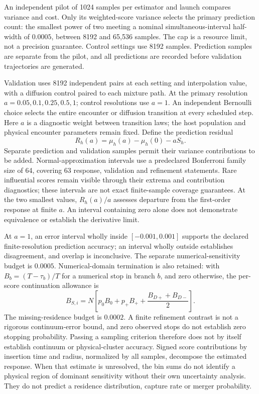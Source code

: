 \documentclass[aps,prd,reprint,amsmath,amssymb,superscriptaddress,nofootinbib,longbibliography,floatfix]{revtex4-2}
\begin{document}
An independent pilot of 1024 samples per estimator and launch compares variance and cost. Only its weighted-score variance selects the primary prediction count: the smallest power of two meeting a nominal simultaneous-interval half-width of $0.0005$, between 8192 and 65,536 samples. The cap is a resource limit, not a precision guarantee. Control settings use 8192 samples. Prediction samples are separate from the pilot, and all predictions are recorded before validation trajectories are generated.

Validation uses 8192 independent pairs at each setting and interpolation value, with a diffusion control paired to each mixture path. At the primary resolution $a=0.05,0.1,0.25,0.5,1$; control resolutions use $a=1$. An independent Bernoulli choice selects the entire encounter or diffusion transition at every scheduled step. Here $a$ is a diagnostic weight between transition laws; the host population and physical encounter parameters remain fixed. Define the prediction residual
\begin{equation}
R_h(a)=\mu_h(a)-\mu_h(0)-aS_h.
\label{eq:response-validation-residual}
\end{equation}
Separate prediction and validation samples permit their variance contributions to be added. Normal-approximation intervals use a predeclared Bonferroni family size of 64, covering 63 response, validation and refinement statements. Rare influential scores remain visible through their extrema and contribution diagnostics; these intervals are not exact finite-sample coverage guarantees. At the two smallest values, $R_h(a)/a$ assesses departure from the first-order response at finite $a$. An interval containing zero alone does not demonstrate equivalence or establish the derivative limit.

At $a=1$, an error interval wholly inside $[-0.001,0.001]$ supports the declared finite-resolution prediction accuracy; an interval wholly outside establishes disagreement, and overlap is inconclusive. The separate numerical-sensitivity budget is $0.0005$. Numerical-domain termination is also retained: with $B_b=(T-\tau_b)/T$ for a numerical stop in branch $b$, and zero otherwise, the per-score continuation allowance is
\begin{equation}
B_{S,i}=N\left[p_0B_0+p_+B_+
+\frac{B_{D+}+B_{D-}}2\right].
\label{eq:response-continuation-bound}
\end{equation}
The missing-residence budget is $0.0002$. A finite refinement contrast is not a rigorous continuum-error bound, and zero observed stops do not establish zero stopping probability. Passing a sampling criterion therefore does not by itself establish continuum or physical-cluster accuracy. Signed score contributions by insertion time and radius, normalized by all samples, decompose the estimated response. When that estimate is unresolved, the bin sums do not identify a physical region of dominant sensitivity without their own uncertainty analysis. They do not predict a residence distribution, capture rate or merger probability.
\end{document}

